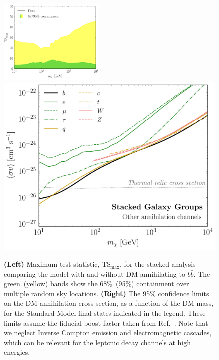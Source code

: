\begin{figure}[t]
  \centering
   \includegraphics[width=0.45\textwidth]{ch-clusters/plots/global_maxts.pdf}
  \includegraphics[width=.45\textwidth]{ch-clusters/plots/other_annh.pdf}
  \caption{\textbf{(Left)} Maximum test statistic, TS$_\text{max}$, for the stacked analysis comparing the model with and without DM annihilating to $b \bar b$.  The green~(yellow) bands show the 68\%~(95\%) containment over multiple random sky locations.  \textbf{(Right)} The 95\% confidence limits on the DM annihilation cross section, as a function of the DM mass, for the Standard Model final states indicated in the legend.  These limits assume the fiducial boost factor taken from Ref.~\cite{Bartels:2015uba}.  Note that we neglect Inverse Compton emission and electromagnetic cascades, which can be relevant for the leptonic decay channels at high energies.}
  \label{fig:other_lims}
\end{figure}


